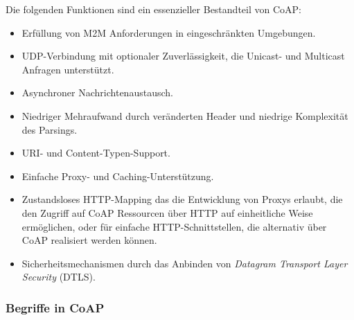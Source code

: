 Die folgenden Funktionen sind ein essenzieller Bestandteil von CoAP:
\begin{itemize}
    \item Erfüllung von M2M Anforderungen in eingeschränkten Umgebungen.
    \item UDP-Verbindung mit optionaler Zuverlässigkeit, die Unicast- und Multicast Anfragen unterstützt.
    \item Asynchroner Nachrichtenaustausch.
    \item Niedriger Mehraufwand durch veränderten Header und niedrige Komplexität des Parsings.
    \item URI- und Content-Typen-Support.
    \item Einfache Proxy- und Caching-Unterstützung.
    \item Zustandsloses HTTP-Mapping das die Entwicklung von Proxys erlaubt, die den Zugriff auf CoAP Ressourcen über HTTP auf einheitliche Weise ermöglichen, oder für einfache HTTP-Schnittstellen, die alternativ über CoAP realisiert werden können.
    \item Sicherheitsmechanismen durch das Anbinden von \textit{Datagram Transport Layer Security} (DTLS).
\end{itemize}

\subsubsection{Begriffe in CoAP}
\label{subsubsec:begiffe-in-coap}

